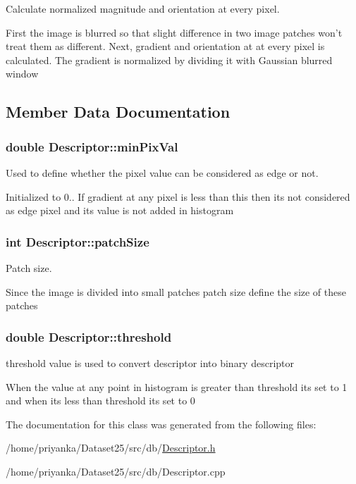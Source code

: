 \-Calculate normalized magnitude and orientation at every pixel. 

\-First the image is blurred so that slight difference in two image patches won't treat them as different. \-Next, gradient and orientation at at every pixel is calculated. \-The gradient is normalized by dividing it with \-Gaussian blurred window 

\subsection{\-Member \-Data \-Documentation}
\hypertarget{classDescriptor_a64392290391afd9000a085710513c381}{
\subsubsection[{min\-Pix\-Val}]{\setlength{\rightskip}{0pt plus 5cm}double {\bf \-Descriptor\-::min\-Pix\-Val}}}\label{classDescriptor_a64392290391afd9000a085710513c381}


\-Used to define whether the pixel value can be considered as edge or not. 

\-Initialized to 0.. \-If gradient at any pixel is less than this then its not considered as edge pixel and its value is not added in histogram \hypertarget{classDescriptor_a1ae195a424d69f9e1d754fcceee3c0ad}{
\subsubsection[{patch\-Size}]{\setlength{\rightskip}{0pt plus 5cm}int {\bf \-Descriptor\-::patch\-Size}}}\label{classDescriptor_a1ae195a424d69f9e1d754fcceee3c0ad}


\-Patch size. 

\-Since the image is divided into small patches patch size define the size of these patches \hypertarget{classDescriptor_a17990364a2abbf2c531a2b644be57bf4}{
\subsubsection[{threshold}]{\setlength{\rightskip}{0pt plus 5cm}double {\bf \-Descriptor\-::threshold}}}\label{classDescriptor_a17990364a2abbf2c531a2b644be57bf4}


threshold value is used to convert descriptor into binary descriptor 

\-When the value at any point in histogram is greater than threshold its set to 1 and when its less than threshold its set to 0 

\-The documentation for this class was generated from the following files\-:\begin{DoxyCompactItemize}
\item 
/home/priyanka/\-Dataset25/src/db/\hyperlink{Descriptor_8h}{\-Descriptor.\-h}\item 
/home/priyanka/\-Dataset25/src/db/\-Descriptor.\-cpp\end{DoxyCompactItemize}
